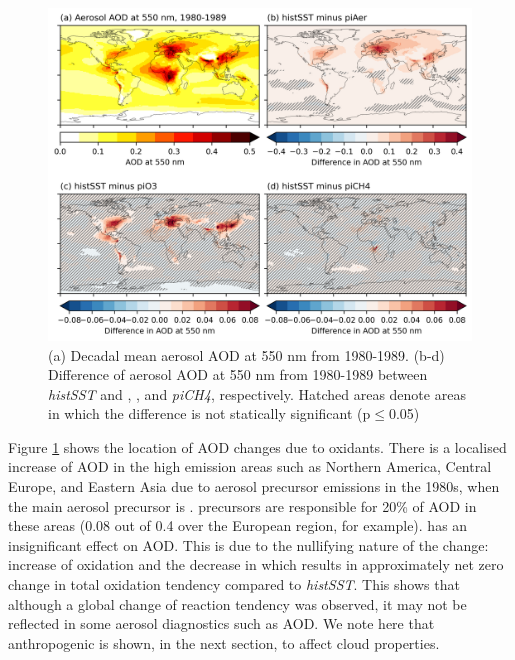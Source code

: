 \begin{figure}
    \centering
    \includegraphics[width=\linewidth]{Chapter3/Figs/f06_aod-map.png}
    \caption[Mean aerosol AOD at 550 nm from 1980-1989 and changes to AOD due to SLCFs]{(a) Decadal mean aerosol AOD at 550 nm from 1980-1989. (b-d) Difference of aerosol AOD at 550 nm from 1980-1989 between \textit{histSST} and \sstpiaer{}, \sstpio{}, and \textit{piCH4}, respectively. Hatched areas denote areas in which the difference is not statically significant (p$\leq$0.05)}
    \label{fig:ch3:AOD-map}
\end{figure}


Figure \ref{fig:ch3:AOD-map} shows the location of AOD changes due to oxidants. There is a localised increase of AOD in the high emission areas such as Northern America, Central Europe, and Eastern Asia due to aerosol precursor emissions in the 1980s, when the main aerosol precursor is .  precursors are responsible for 20\% of AOD in these areas (0.08 out of 0.4 over the European region, for example).  has an insignificant effect on AOD. This is due to the nullifying nature of the change: increase of  oxidation and the decrease in  which results in approximately net zero change in total oxidation tendency compared to \textit{histSST}. This shows that although a global change of reaction tendency was observed, it may not be reflected in some aerosol diagnostics such as AOD. We note here that anthropogenic  is shown, in the next section, to affect cloud properties.


